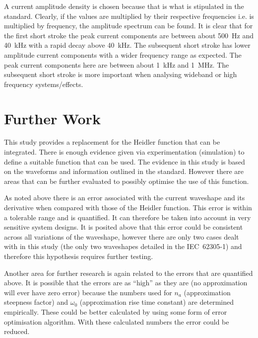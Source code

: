 A current amplitude density is chosen because that is what is stipulated in the standard. Clearly, if the values are multiplied by their respective frequencies i.e.  is multiplied by frequency, the amplitude spectrum can be found. It is clear that for the first short stroke the peak current components are between about 500~Hz and 40~kHz with a rapid decay above 40~kHz. The subsequent short stroke has lower amplitude current components with a wider frequency range as expected. The peak current components here are between about 1~kHz and 1~MHz. The subsequent short stroke is more important when analysing wideband or high frequency systems/effects.


\section{Further Work}
\label{sec:discussion_further_work}
This study provides a replacement for the Heidler function that can be integrated. There is enough evidence given via experimentation (simulation) to define a suitable function that can be used. The evidence in this study is based on the waveforms and information outlined in the standard. However there are areas that can be further evaluated to possibly optimise the use of this function.

As noted above there is an error associated with the current waveshape and its derivative when compared with those of the Heidler function. This error is within a tolerable range and is quantified. It can therefore be taken into account in very sensitive system designs. It is posited above that this error could be consistent across all variations of the waveshape, however there are only two cases dealt with in this study (the only two waveshapes detailed in the IEC~62305-1) and therefore this hypothesis requires further testing.

Another area for further research is again related to the errors that are quantified above. It is possible that the errors are as ``high'' as they are (no approximation will ever have zero error) because the numbers used for $n_a$ (approximation steepness factor) and $\omega_0$ (approximation rise time constant) are determined empirically. These could be better calculated by using some form of error optimisation algorithm. With these calculated numbers the error could be reduced.

